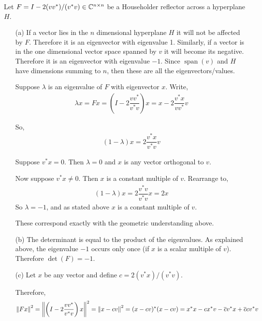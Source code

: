 \documentclass[10pt]{article}
\begin{document}
\begin{solution}[Solution]
    Let \( F=I-2(vv^*)/(v^*v)\in\mathbb{C}^{n\times n} \) be a Householder reflector across a hyperplane \( H \).

\begin{enumerate}
    \item[(a)] If a vector lies in the \( n \) dimensional hyperplane \( H \) it will not be affected by \( F \). Therefore it is an eigenvector with eigenvalue 1. Similarly, if a vector is in the one dimensional vector space spanned by \( v \) it will become its negative. Therefore it is an eigenvector with eigenvalue \( -1 \). Since \( \operatorname{span}(v) \) and \( H \) have dimensions summing to \( n \), then these are all the eigenvectors/values.

        Suppose \( \lambda \) is an eigenvalue of \( F \) with eigenvector \( x \). Write,
        \begin{align*}
            \lambda x = Fx=\left(I-2 \dfrac{vv^*}{v^*v}\right)x = x-2 \dfrac{v^*x}{vv^*} v
        \end{align*}

        So,
        \begin{align*}
            (1-\lambda)x=2 \dfrac{v^*x}{v^*v} v
        \end{align*}

        Suppose \( v^*x=0 \). Then \( \lambda = 0 \) and \( x \) is any vector orthogonal to \( v \).

        Now suppose \( v^*x\neq 0 \). Then \( x \) is a constant multiple of \( v \). Rearrange to,
        \begin{align*}
            (1-\lambda)x=2 \dfrac{v^*v}{v^*v}x = 2x
        \end{align*}
        So \( \lambda=-1 \), and as stated above \( x \) is a constant multiple of \( v \). 

        These correspond exactly with the geometric understanding above.

    \item[(b)]
        The determinant is equal to the product of the eigenvalues. As explained above, the eigenvalue \( -1 \) occurs only once (if \( x \) is a scalar multiple of \( v \)). Therefore \( \det(F)=-1 \).

    \item[(c)]
        Let \( x \) be any vector and define \( c=2(v^*x)/(v^*v) \).

        Therefore,
        \begin{align*}
            \left\lVert Fx\right\rVert^2 = \left\lVert\left(I-2\dfrac{vv^*}{v^*v}\right)x\right\rVert^2 = \left\lVert x-cv\right\rVert^2 = (x-cv)^*(x-cv) = x^*x-cx^*v-\overline{c}v^*x+\overline{c}cv^*v
        \end{align*}


\end{enumerate}
\end{solution}
\end{document}
